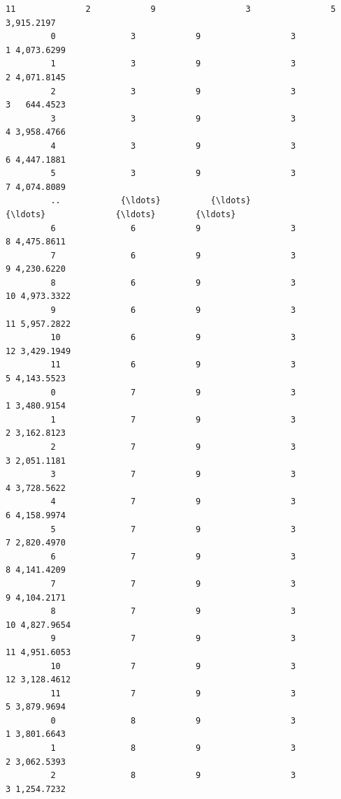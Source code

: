 \documentclass[11pt]{article}
\begin{document}
\begin{Verbatim}[commandchars=\\\{\}]
         11              2            9                  3                5 3,915.2197   
         0               3            9                  3                1 4,073.6299   
         1               3            9                  3                2 4,071.8145   
         2               3            9                  3                3   644.4523   
         3               3            9                  3                4 3,958.4766   
         4               3            9                  3                6 4,447.1881   
         5               3            9                  3                7 4,074.8089   
         ..            {\ldots}          {\ldots}                {\ldots}              {\ldots}        {\ldots}   
         6               6            9                  3                8 4,475.8611   
         7               6            9                  3                9 4,230.6220   
         8               6            9                  3               10 4,973.3322   
         9               6            9                  3               11 5,957.2822   
         10              6            9                  3               12 3,429.1949   
         11              6            9                  3                5 4,143.5523   
         0               7            9                  3                1 3,480.9154   
         1               7            9                  3                2 3,162.8123   
         2               7            9                  3                3 2,051.1181   
         3               7            9                  3                4 3,728.5622   
         4               7            9                  3                6 4,158.9974   
         5               7            9                  3                7 2,820.4970   
         6               7            9                  3                8 4,141.4209   
         7               7            9                  3                9 4,104.2171   
         8               7            9                  3               10 4,827.9654   
         9               7            9                  3               11 4,951.6053   
         10              7            9                  3               12 3,128.4612   
         11              7            9                  3                5 3,879.9694   
         0               8            9                  3                1 3,801.6643   
         1               8            9                  3                2 3,062.5393   
         2               8            9                  3                3 1,254.7232   

\end{Verbatim}
\end{document}
